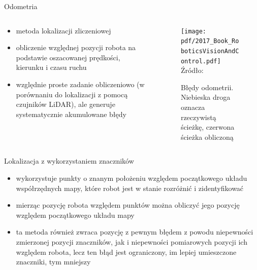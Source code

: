 \begin{frame}
{Odometria}
	\begin{columns}
		\begin{column}{0.45\textwidth}
			\begin{itemize}
				\item metoda lokalizacji zliczeniowej
				\item obliczenie względnej pozycji robota na podstawie oszacowanej prędkości, kierunku i czasu ruchu
				\item względnie proste zadanie obliczeniowo (w porównaniu do lokalizacji z pomocą czujników LiDAR), ale generuje systematycznie akumulowane błędy
			\end{itemize}
		\end{column}
		\begin{column}{0.55\textwidth}  %
			\begin{figure}
				\begin{center}
					\texttt{[image: pdf/2017\_Book\_RoboticsVisionAndControl.pdf]}
					\hspace*{15pt}\hbox{\scriptsize{Źródło:}}
					\caption{Błędy odometrii. Niebieska droga oznacza rzeczywistą ścieżkę, czerwona ścieżka obliczoną }
				\end{center}
			\end{figure}
		\end{column}
	\end{columns}
\end{frame}

\begin{frame}
{Lokalizacja z wykorzystaniem znaczników}
	\begin{itemize}
		\item wykorzystuje punkty o znanym położeniu względem początkowego układu współrzędnych mapy, które robot jest w stanie rozróżnić i zidentyfikować
		\item mierząc pozycję robota względem punktów można obliczyć jego pozycję względem początkowego układu mapy
		\item ta metoda również zwraca pozycję z pewnym błędem z powodu niepewności zmierzonej pozycji znaczników, jak i niepewności pomiarowych pozycji ich względem robota, lecz ten błąd jest ograniczony, im lepiej umieszczone znaczniki, tym mniejszy
	\end{itemize}
\end{frame}


